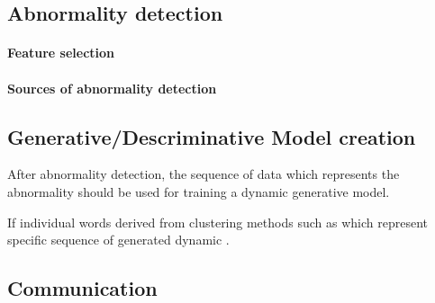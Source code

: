 \documentclass{article}
\begin{document}
		
		\subsection{Abnormality detection}
			\paragraph{Feature selection}
			\paragraph{Sources of abnormality detection}
		
		\subsection{Generative/Descriminative  Model creation}
			After abnormality detection, the sequence of data which represents the abnormality should be used for training a dynamic generative model. 
		
		If individual words derived from clustering methods such as \cite{kanapram-2019-dynamic-bayesian-approach-for-decision-making-in-ego-things} which represent specific sequence of generated dynamic .
		
		\subsection{Communication}
\end{document}

